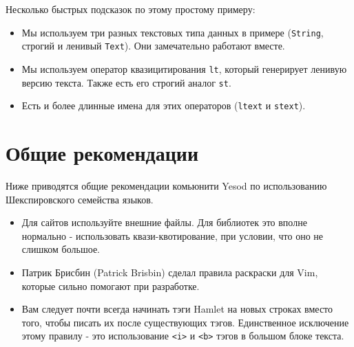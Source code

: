 Несколько быстрых подсказок по этому простому примеру:
\begin{itemize}
\item Мы используем три разных текстовых типа данных в примере 
(\lstinline!String!, строгий и ленивый \lstinline!Text!). Они замечательно
работают вместе.
\item Мы используем оператор квазицитирования \lstinline!lt!, который генерирует
ленивую версию текста. Также есть его строгий аналог \lstinline!st!.
\item Есть и более длинные имена для этих операторов 
(\lstinline!ltext! и \lstinline!stext!).
\end{itemize}

\section{Общие рекомендации}

Ниже приводятся общие рекомендации комьюнити Yesod по использованию
Шекспировского семейства языков.

\begin{itemize}
\item Для сайтов используйте внешние файлы. Для библиотек это вполне 
нормально - использовать квази-квотирование, при условии, что оно не слишком большое.
\item Патрик Брисбин (Patrick Brisbin) сделал правила раскраски для Vim, 
которые сильно помогают при разработке.
\item Вам следует почти всегда начинать тэги Hamlet на новых строках вместо того,
чтобы писать их после существующих тэгов. Единственное исключение этому правилу - это
использование \lstinline!<i>! и \lstinline!<b>! тэгов в большом блоке текста.
\end{itemize}


